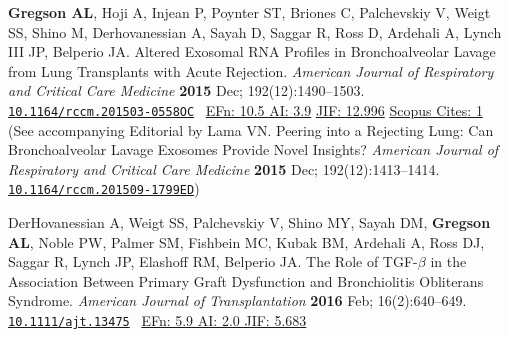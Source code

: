 \documentclass[letterpaper,11pt,sans,dvipsnames,final]{/usr/local/share/texmf-dist/tex/latex/moderncv/moderncv}%
\begin{document}
\begin{thebibliography}{1}
  \bibitem[28]{} \textbf{Gregson AL}, Hoji A, Injean P, Poynter ST, Briones C, Palchevskiy V, Weigt SS, Shino M, Derhovanessian A, Sayah D, Saggar R, Ross D, Ardehali A, Lynch III JP, Belperio JA. Altered Exosomal RNA Profiles in Bronchoalveolar Lavage from Lung Transplants with Acute Rejection. {\color{BrickRed}\textit{American Journal of Respiratory and Critical Care Medicine}} \textbf{2015} Dec; 192(12):1490--1503. \href{http://www.atsjournals.org/doi/abs/10.1164/rccm.201503-0558OC#.VeDm8JWW25M}{\nolinkurl{10.1164/rccm.201503-0558OC}}~ 
    {\color{NavyBlue}\href{http://www.eigenfactor.org/rankings.php?bsearch=AMERICAN+JOURNAL+OF+RESPIRATORY+AND+CRITICAL+CARE+MEDICINE&searchby=journal&orderby=eigenfactor}{{\smaller EFn: 10.5 AI: 3.9}}
      \href{http://admin-apps.webofknowledge.com/JCR/JCR?RQ=RECORD&rank=1&journal=AM+J+RESP+CRIT+CARE}{{\smaller JIF: 12.996}}
      \href{http://www.scopus.com/record/display.uri?eid=2-s2.0-84951933250&origin=resultslist&sort=plf-f&src=s&st1=gregson+&st2=&sid=A253098209782A207E8DEF555629A3D6.iqs8TDG0Wy6BURhzD3nFA%3a90&sot=b&sdt=b&sl=19&s=FIRSTAUTH%28gregson+%29&relpos=0&citeCnt=1&searchTerm=FIRSTAUTH%28gregson+%29}{{\smaller Scopus Cites: 1}}
    }~ 
    \\(See accompanying Editorial by Lama VN. Peering into a Rejecting Lung: Can Bronchoalveolar Lavage Exosomes Provide Novel Insights? {\color{BrickRed}\textit{American Journal of Respiratory and Critical Care Medicine}} \textbf{2015} Dec; 192(12):1413--1414. \href{http://www.atsjournals.org/doi/abs/10.1164/rccm.201509-1799ED}{\nolinkurl{10.1164/rccm.201509-1799ED}})

  \bibitem[29]{} DerHovanessian A, Weigt SS, Palchevskiy V, Shino MY, Sayah DM, \textbf{Gregson AL}, Noble PW, Palmer SM, Fishbein MC, Kubak BM, Ardehali A, Ross DJ, Saggar R, Lynch JP, Elashoff RM, Belperio JA. The Role of {\smaller TGF}-$\beta$ in the Association Between Primary Graft Dysfunction and Bronchiolitis Obliterans Syndrome. {\color{BrickRed}\textit{American Journal of Transplantation}} \textbf{2016} Feb; 16(2):640--649. \href{http://onlinelibrary.wiley.com/doi/10.1111/ajt.13475/abstract}{\nolinkurl{10.1111/ajt.13475}}~
       {\color{NavyBlue}\href{http://52.6.43.8/projects/journalRank/rankings.php?bsearch=AMERICAN+JOURNAL+OF+TRANSPLANTATION&searchby=journal&orderby=eigenfactor}{{\smaller EFn: 5.9 AI: 2.0 JIF: 5.683}} 
       }


\end{thebibliography}
\end{document}
